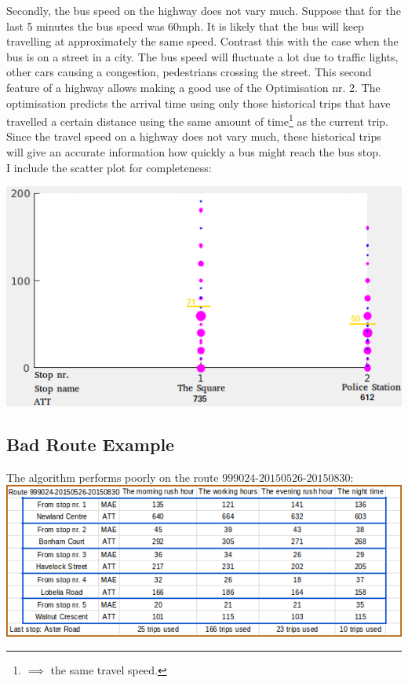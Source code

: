 \documentclass[12pt,a4paper,oneside,openright]{report}
\begin{document}
Secondly, the bus speed on the highway does not vary
much. Suppose that for the last 5 minutes the bus speed was $60$mph. It is 
likely that the bus will keep travelling at approximately the same speed. Contrast this with the
case when the bus is on a street in a city. The bus speed will fluctuate a lot due to
traffic lights, other cars causing a congestion, pedestrians crossing the street.
This second feature of a highway allows making a good use of the
Optimisation nr. 2. The optimisation predicts the arrival time using only those
historical trips that have travelled a certain distance using the same amount of
time\footnote{$\implies$ the same travel speed.} as the current trip. Since the travel
speed on a highway does not vary much, these historical trips will give an accurate
information how quickly a bus might reach the bus stop. \\

I include the scatter plot for completeness:

\includegraphics[scale=0.5]{figs/best_scatter_plot.png}

\subsection*{Bad Route Example}

The algorithm performs poorly on the route $999024$-$20150526$-$20150830$: \\

\includegraphics[width=\textwidth]{figs/table_of_999024.png} \\
\end{document}
